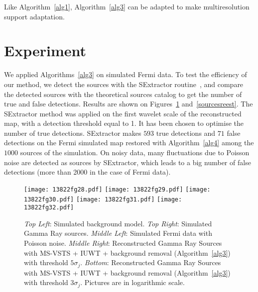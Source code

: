 Like Algorithm~\ref{alg1}, Algorithm~\ref{alg3} can be adapted to make multiresolution support adaptation.


\section{Experiment}

We applied Algorithms~\ref{alg3} on simulated Fermi data. To test the efficiency of our method, we detect the sources with the SExtractor routine~\citep{astro:bertin96}, and compare the detected sources with the theoretical sources catalog to get the number of true and false detections. Results are shown on Figures~\ref{sources} and~\ref{sourcesreest}. The SExtractor method was applied on the first wavelet scale of the reconstructed map, with a detection threshold equal to 1. It has been chosen to optimise the number of true detections. SExtractor makes $593$ true detections and $71$ false detections on the Fermi simulated map restored with Algorithm~\ref{alg4} among the $1000$ sources of the simulation. On noisy data, many fluctuations due to Poisson noise are detected as sources by SExtractor, which leads to a big number of false detections (more than 2000 in the case of Fermi data). 

\begin{figure}[htb]
\begin{center}
\texttt{[image: 13822fg28.pdf]} \hfill
\texttt{[image: 13822fg29.pdf]} \hfill
\texttt{[image: 13822fg30.pdf]} \hfill
\texttt{[image: 13822fg31.pdf]} \hfill
\texttt{[image: 13822fg32.pdf]}
\caption{\emph{Top Left}: Simulated background model.
\emph{Top Right}: Simulated Gamma Ray sources.
\emph{Middle Left}: Simulated Fermi data with Poisson noise.
\emph{Middle Right}: Reconstructed Gamma Ray Sources with MS-VSTS + IUWT + background removal (Algorithm~\ref{alg3}) with threshold $5\sigma_j$.
\emph{Bottom}: Reconstructed Gamma Ray Sources with MS-VSTS + IUWT + background removal (Algorithm~\ref{alg3}) with threshold $3\sigma_j$.
Pictures are in logarithmic scale.}
\label{sources}
\end{center}
\end{figure}

